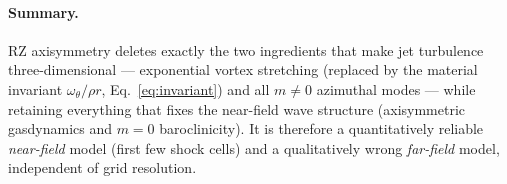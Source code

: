 \documentclass[11pt]{article}
\begin{document}
\paragraph{Summary.}
RZ axisymmetry deletes exactly the two ingredients that make jet
turbulence three-dimensional --- exponential vortex stretching
(replaced by the material invariant $\omega_\theta/\rho r$,
Eq.~\ref{eq:invariant}) and all $m\neq0$ azimuthal modes --- while
retaining everything that fixes the near-field wave structure
(axisymmetric gasdynamics and $m=0$ baroclinicity). It is therefore a
quantitatively reliable \emph{near-field} model (first few shock
cells) and a qualitatively wrong \emph{far-field} model, independent
of grid resolution.
\end{document}
